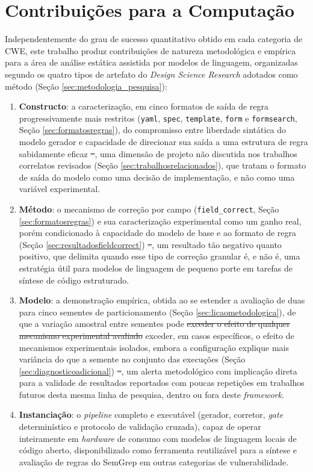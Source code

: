 \documentclass[
    12pt,                %
    openright,           %
    oneside,             %
    a4paper,             %
    english,             %
    brazil               %
]{abntex2}
\newcommand{\antigo}[1]{\sout{#1}}
\newcommand{\novo}[1]{{\color{red}#1}}
\begin{document}
\section{Contribuições para a Computação}
\par
Independentemente do grau de sucesso quantitativo obtido em cada categoria de CWE, este trabalho produz contribuições de natureza metodológica e empírica para a área de análise estática assistida por modelos de linguagem, organizadas segundo os quatro tipos de artefato do \textit{Design Science Research} \cite{hevner2004design} adotados como método (Seção \ref{sec:metodologia_pesquisa}):
\begin{enumerate}
  \item \textbf{Constructo}: a caracterização, em cinco formatos de saída de regra progressivamente mais restritos (\texttt{yaml}, \texttt{spec}, \texttt{template}, \texttt{form} e \texttt{formsearch}, Seção \ref{sec:formatosregras}), do compromisso entre liberdade sintática do modelo gerador e capacidade de direcionar sua saída a uma estrutura de regra sabidamente eficaz\antigo{ --}\novo{,} uma dimensão de projeto não discutida nos trabalhos correlatos revisados (Seção \ref{sec:trabalhosrelacionados}), que tratam o formato de saída do modelo como uma decisão de implementação, e não como uma variável experimental.
  \item \textbf{Método}: o mecanismo de correção por campo (\texttt{field\_correct}, Seção \ref{sec:formatosregras}) e sua caracterização experimental como um ganho real, porém condicionado à capacidade do modelo de base e ao formato de regra (Seção \ref{sec:resultadosfieldcorrect})\antigo{ --}\novo{,} um resultado tão negativo quanto positivo, que delimita quando esse tipo de correção granular é, e não é, uma estratégia útil para modelos de linguagem de pequeno porte em tarefas de síntese de código estruturado.
  \item \textbf{Modelo}: a demonstração empírica, obtida ao se estender a avaliação de duas para cinco sementes de particionamento (Seção \ref{sec:licaometodologica}), de que a variação amostral entre sementes pode \antigo{exceder o efeito de qualquer mecanismo experimental avaliado} \novo{exceder, em casos específicos, o efeito de mecanismos experimentais isolados, embora a configuração explique mais variância do que a semente no conjunto das execuções (Seção \ref{sec:diagnosticoadicional})}\antigo{ --}\novo{,} um alerta metodológico com implicação direta para a validade de resultados reportados com poucas repetições em trabalhos futuros desta mesma linha de pesquisa, dentro ou fora deste \textit{framework}.
  \item \textbf{Instanciação}: o \textit{pipeline} completo e executável (gerador, corretor, \textit{gate} determinístico e protocolo de validação cruzada), capaz de operar inteiramente em \textit{hardware} de consumo com modelos de linguagem locais de código aberto, disponibilizado como ferramenta reutilizável para a síntese e avaliação de regras do SemGrep em outras categorias de vulnerabilidade.
\end{enumerate}
\end{document}
